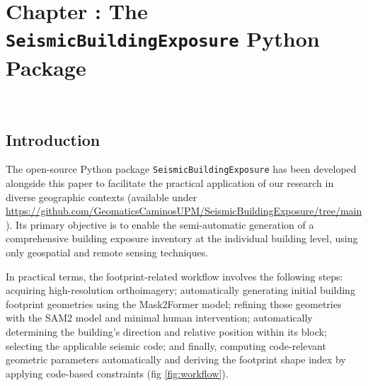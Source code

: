 \graphicspath{
    {figures_and_references/footprints_paper/}
    {figures_and_references/EELISA_conference/}
}

\renewcommand{\chapternametext}{Chapter \thechapter: The \texttt{SeismicBuildingExposure} Python Package}


\chapter{\chapternametext}
\

\renewcommand{\headingtextL}{}
\renewcommand{\headingtextR}{\chapternametext}
\begingroup
 \flushbottom
 \setlength{\parskip}{0pt plus 1fil}%
 \localtableofcontents 
\endgroup

\begingroup
 \flushbottom
 \setlength{\parskip}{0pt plus 1fil}%
 \locallistoffigures
\endgroup


\newpage

\setcounter{section}{0} 



\FloatBarrier

\renewcommand{\sectionnametext}{Introduction}
\renewcommand{\headingtextL}{\chapternametext}
\renewcommand{\headingtextR}{\thesection. \sectionnametext}
\section{\sectionnametext}


The open-source Python package \texttt{SeismicBuildingExposure} has been developed alongside this paper to facilitate the practical application of our research in diverse geographic contexts (available under \url{https://github.com/GeomaticsCaminosUPM/SeismicBuildingExposure/tree/main}). 
Its primary objective is to enable the semi-automatic generation of a comprehensive building exposure inventory at the individual building level, using only geospatial and remote sensing techniques.

In practical terms, the footprint-related workflow involves the following steps: acquiring high-resolution orthoimagery; automatically generating initial building footprint geometries using the Mask2Former model; refining those geometries with the SAM2 model and minimal human intervention; automatically determining the building's direction and relative position within its block; selecting the applicable seismic code; and finally, computing code-relevant geometric parameters automatically and deriving the footprint shape index by applying code-based constraints (fig \ref{fig:workflow}).

